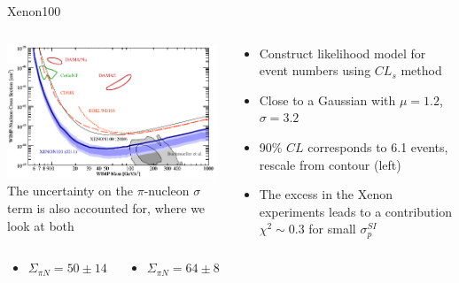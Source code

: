 \documentclass{beamer}
\begin{document}
\begin{frame}{Xenon100}
  \begin{columns}
    \begin{column}{0.55\textwidth}
      \includegraphics[height=4cm]{xenon.pdf}\\
      The uncertainty on the $\pi$-nucleon $\sigma$ term is also accounted for,
      where we look at both 
      \begin{columns} 
        \begin{column}{0.5\textwidth}
          \begin{itemize}
            \item \small$\Sigma_{\pi N}=50\pm14$
          \end{itemize}
        \end{column}

        \begin{column}{0.5\textwidth}
          \begin{itemize}
            \item \small$\Sigma_{\pi N}=64\pm8$
          \end{itemize}
        \end{column}
      \end{columns}
    \end{column}

    \begin{column}{0.45\textwidth}
      \begin{itemize}
        \item Construct likelihood model for event numbers using $CL_{s}$ method
        \item Close to a Gaussian with $\mu=1.2$, $\sigma=3.2$
        \item 90\% $CL$ corresponds to 6.1 events, rescale from contour (left)
        \item The excess in the Xenon experiments leads to a contribution
        $\chi^{2}\sim0.3$ for small $\sigma_{p}^{SI}$
      \end{itemize}
    \end{column}
  \end{columns}
\end{frame}
\end{document}
